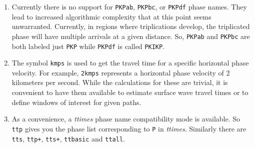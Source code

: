 \begin{enumerate}
\item Currently there is no support for \texttt{PKPab}, \texttt{PKPbc},
or \texttt{PKPdf} phase names.
They lead to increased algorithmic complexity that at this point seems
unwarranted.
Currently, in regions where triplications develop, the triplicated phase will have multiple
arrivals at a given distance.
So, \texttt{PKPab} and \texttt{PKPbc} are
both labeled just \texttt{PKP} while \texttt{PKPdf} is called \texttt{PKIKP}.

\item \label{kmps}
The symbol \texttt{kmps} is used to get the travel time for a
specific horizontal phase velocity.
For example, \texttt{2kmps} represents a horizontal phase
velocity of 2 kilometers per second.
While the calculations for these are trivial, it is convenient
to have them available to estimate surface wave travel times or to define windows of
interest for given paths.

\item As a convenience, a \textit{ttimes} phase name compatibility mode is available.
So \texttt{ttp} gives
you the phase list corresponding to \texttt{P} in \textit{ttimes}.
Similarly there are \texttt{tts}, \texttt{ttp+},
\texttt{tts+}, \texttt{ttbasic} and \texttt{ttall}.

\end{enumerate}
